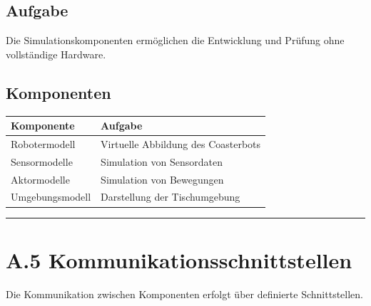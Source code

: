 \documentclass[
  a4paper,
  12pt,
  DIV=12,        %
  parskip=half,  %
  headings=small %
]{scrartcl}
\theoremstyle{definition}
\theoremstyle{definition}
\begin{document}
\subsection{Aufgabe}\label{aufgabe-11}

Die Simulationskomponenten ermöglichen die Entwicklung und Prüfung ohne
vollständige Hardware.

\subsection{Komponenten}\label{komponenten-2}

\begin{longtable}[]{@{}ll@{}}
\toprule\noalign{}
Komponente & Aufgabe \\
\midrule\noalign{}
\endhead
\bottomrule\noalign{}
\endlastfoot
Robotermodell & Virtuelle Abbildung des Coasterbots \\
Sensormodelle & Simulation von Sensordaten \\
Aktormodelle & Simulation von Bewegungen \\
Umgebungsmodell & Darstellung der Tischumgebung \\
\end{longtable}

\begin{center}\rule{0.5\linewidth}{0.5pt}\end{center}

\section{A.5
Kommunikationsschnittstellen}\label{a.5-kommunikationsschnittstellen}

Die Kommunikation zwischen Komponenten erfolgt über definierte
Schnittstellen.
\end{document}
